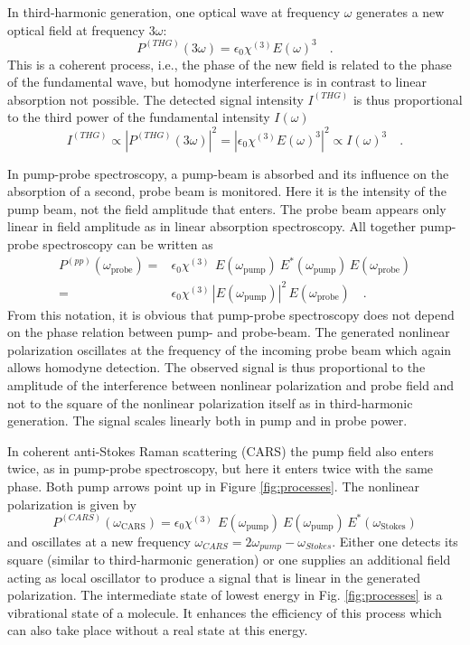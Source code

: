In third-harmonic generation, one optical wave at frequency $\omega$ generates a new optical field at frequency $3 \omega$: 
%
\begin{equation}
P^{(THG)}(3 \omega) = \epsilon_0 \chi^{(3)} E(\omega)^3  \quad .
\label{eq:chi3-thg}
\end{equation}
%
This is a coherent process, i.e., the phase of the new field is related to the phase of the fundamental wave, but homodyne interference is in contrast to linear absorption not possible. The detected signal intensity $I^{(THG)}$ is thus proportional to the third power of the fundamental intensity $I(\omega)$
\begin{equation}
I^{(THG)} \propto \left| P^{(THG)}(3 \omega) \right|^2 = \left| \epsilon_0 \chi^{(3)} E(\omega)^3 \right|^2 \propto I(\omega)^3 \quad .
\label{eq:intensi-thg}
\end{equation}


In pump-probe spectroscopy, a pump-beam is absorbed and its influence on the absorption of a second, probe beam is monitored. Here it is the intensity of the pump beam, not the field amplitude that enters. The probe beam appears only linear in field amplitude as in linear absorption spectroscopy.
All together pump-probe spectroscopy can be written as
%
\begin{align}
P^{(pp)}(\omega_{\text{probe}}) = &
\epsilon_0 \chi^{(3)} \, \ E(\omega_{\text{pump}}) \ E^*(\omega_{\text{pump}})  \, E(\omega_{\text{probe}})  \nonumber \\
= &
\epsilon_0 \chi^{(3)} \, \left| E(\omega_{\text{pump}})  \right|^2 \, E(\omega_{\text{probe}})  
\quad .
\label{eq:chi3-pp}
\end{align}
%
From this notation, it is obvious that pump-probe spectroscopy does not depend on the phase relation between pump- and probe-beam.
The generated nonlinear polarization oscillates at the frequency of the incoming probe beam which again allows homodyne detection. The observed signal is thus proportional to the amplitude of the interference between nonlinear polarization and probe field and not to the square of the nonlinear polarization itself as in third-harmonic generation. The  signal  scales linearly both  in pump and in probe power.


In coherent anti-Stokes Raman scattering (CARS) the pump field also enters twice, as in pump-probe spectroscopy, but here it enters twice with the same phase. Both pump arrows point up in Figure \ref{fig:processes}. The nonlinear polarization is given by 
%
\begin{equation}
P^{(CARS)}(\omega_{\text{CARS}}) = 
\epsilon_0 \chi^{(3)} \, \ E(\omega_{\text{pump}}) \ E(\omega_{\text{pump}})  \, E^*(\omega_{\text{Stokes}}) 
\label{eq:chi3-cars}
\end{equation}
%
and oscillates at a new frequency $\omega_{CARS} = 2 \omega_{pump} - \omega_{Stokes}$. Either one detects its square (similar to third-harmonic generation) or one supplies an additional field acting as local oscillator to produce a signal that is linear in the generated polarization. The intermediate state of lowest energy in Fig. \ref{fig:processes} is a vibrational state of a molecule. It enhances the efficiency of this process which can also take place without a real state at this energy. 


